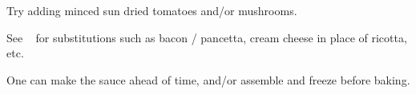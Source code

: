 \begin{variation}
\item Try adding minced sun dried tomatoes and/or mushrooms.

\item See ~\cite{newCookBook2014} for substitutions such as bacon / pancetta,
    cream cheese in place of ricotta, etc.

\item One can make the sauce ahead of time, and/or assemble and freeze before baking.
\end{variation}

\recipeend%
